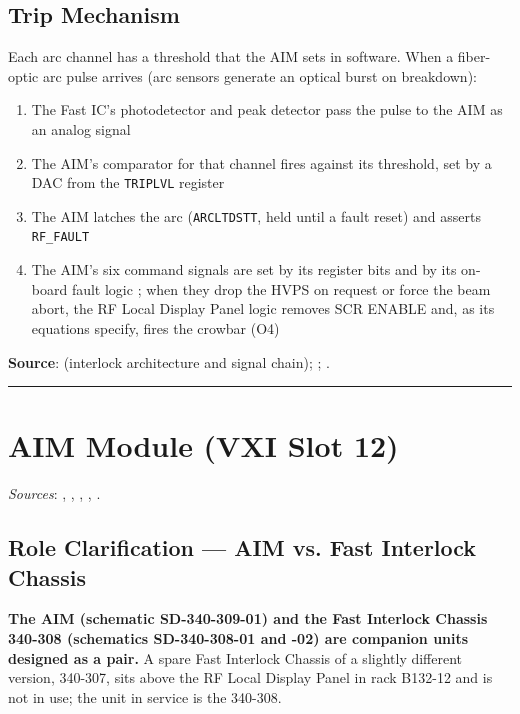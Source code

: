 \subsection{Trip Mechanism}\label{sec:fastic-trip}


Each arc channel has a threshold that the AIM sets in software. When a fiber-optic arc pulse arrives (arc sensors generate an optical burst on breakdown):

\begin{enumerate}
\def\labelenumi{\arabic{enumi}.}
\tightlist
\item
  The Fast IC's photodetector and peak detector pass the pulse to the AIM as an analog signal
\item
  The AIM's comparator for that channel fires against its threshold, set by a DAC from the \texttt{TRIPLVL} register 
\item
  The AIM latches the arc (\texttt{ARCLTDSTT}, held until a fault reset) and asserts \texttt{RF\_FAULT}
\item
  The AIM's six command signals are set by its register bits and by its on-board fault logic ; when they drop the HVPS on request or force the beam abort, the RF Local Display Panel logic removes SCR ENABLE and, as its equations specify, fires the crowbar (O4)
\end{enumerate}

\begin{keynote}
\textbf{Source}:  (interlock architecture and signal chain); ; .
\end{keynote}

\begin{center}\rule{0.5\linewidth}{0.5pt}\end{center}

\section{AIM Module (VXI Slot 12)}\label{sec:aim}

\emph{Sources}: , , , , .


\subsection{Role Clarification --- AIM vs. Fast Interlock Chassis}\label{sec:aim-vs-fastic}


\begin{keynote}
\textbf{The AIM (schematic SD-340-309-01) and the Fast Interlock Chassis 340-308 (schematics SD-340-308-01 and -02) are companion units designed as a pair.} A spare Fast Interlock Chassis of a slightly different version, 340-307, sits above the RF Local Display Panel in rack B132-12 and is not in use; the unit in service is the 340-308.
\end{keynote}

